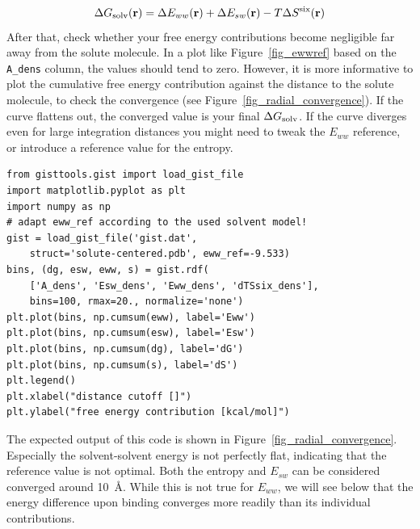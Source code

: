 \documentclass[9pt,tutorial]{livecoms}
\newcommand{\dgsolv}{\Delta G_\textup{solv}}
\newcommand{\software}{\texttt}
\newcommand\inlinecode{\texttt}
\begin{document}
\newcommand{\coordinate}{\mathbf{r}}
\begin{equation}
	\dgsolv(\coordinate) = \Delta E_{ww}(\coordinate) + \Delta E_{sw}(\coordinate) - T\Delta S^\text{six}(\coordinate)
\end{equation}
After that, check whether your free energy contributions become negligible far away from the solute molecule.
In a plot like Figure~\ref{fig_ewwref} based on the \inlinecode{A\_dens} column, the values should tend to zero.
However, it is more informative to plot the cumulative free energy contribution against the distance to the solute molecule, to check the convergence (see Figure~\ref{fig_radial_convergence}).
If the curve flattens out, the converged value is your final $\dgsolv$\@.
If the curve diverges even for large integration distances you might need to tweak the $E_{ww}$ reference, or introduce a reference value for the entropy.

\begin{lstlisting}[style=python]
from gisttools.gist import load_gist_file
import matplotlib.pyplot as plt
import numpy as np
# adapt eww_ref according to the used solvent model! 
gist = load_gist_file('gist.dat',
    struct='solute-centered.pdb', eww_ref=-9.533)
bins, (dg, esw, eww, s) = gist.rdf(
    ['A_dens', 'Esw_dens', 'Eww_dens', 'dTSsix_dens'],
    bins=100, rmax=20., normalize='none')
plt.plot(bins, np.cumsum(eww), label='Eww')
plt.plot(bins, np.cumsum(esw), label='Esw')
plt.plot(bins, np.cumsum(dg), label='dG')
plt.plot(bins, np.cumsum(s), label='dS')
plt.legend()
plt.xlabel("distance cutoff []")
plt.ylabel("free energy contribution [kcal/mol]")
\end{lstlisting}
The expected output of this code is shown in Figure~\ref{fig_radial_convergence}.
Especially the solvent-solvent energy is not perfectly flat, indicating that the reference value is not optimal.
Both the entropy and $E_{sw}$ can be considered converged around \SI{10}{\angstrom}.
While this is not true for $E_{ww}$, we will see below that the energy difference upon binding converges more readily than its individual contributions.
\end{document}
